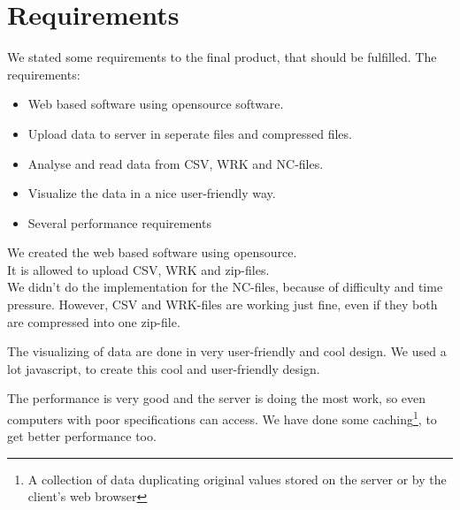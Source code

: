 \chapter{Requirements}
We stated some requirements to the final product, that should be fulfilled. 
The requirements:
\begin{itemize}
\item Web based software using opensource software.
\item Upload data to server in seperate files and compressed files.
\item Analyse and read data from CSV, WRK and NC-files.
\item Visualize the data in a nice user-friendly way.
\item Several performance requirements
\end{itemize}
We created the web based software using opensource.\\
It is allowed to upload CSV, WRK and zip-files.\\
We didn't do the implementation for the NC-files, because of difficulty and time pressure. However, CSV and WRK-files are working just fine, even if they both are compressed into one zip-file.

The visualizing of data are done in very user-friendly and cool design. We used a lot javascript, to create this cool and user-friendly design.

The performance is very good and the server is doing the most work, so even computers with poor specifications can access. We have done some caching\footnote{A collection of data duplicating original values stored on the server or by the client's web browser}, to get better performance too.